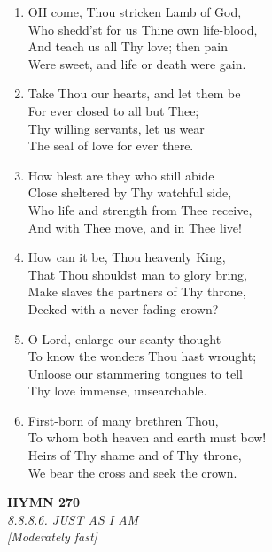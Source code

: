 \begin{enumerate}
    \item OH come, Thou stricken Lamb of God, \\
        Who shedd'st for us Thine own life-blood, \\
        And teach us all Thy love; then pain \\
        Were sweet, and life or death were gain.

    \item Take Thou our hearts, and let them be \\
        For ever closed to all but Thee; \\
        Thy willing servants, let us wear \\
        The seal of love for ever there.

    \item How blest are they who still abide \\
        Close sheltered by Thy watchful side, \\
        Who life and strength from Thee receive, \\
        And with Thee move, and in Thee live!

    \item How can it be, Thou heavenly King, \\
        That Thou shouldst man to glory bring, \\
        Make slaves the partners of Thy throne, \\
        Decked with a never-fading crown?

    \item O Lord, enlarge our scanty thought \\
        To know the wonders Thou hast wrought; \\
        Unloose our stammering tongues to tell \\
        Thy love immense, unsearchable.

    \item First-born of many brethren Thou, \\
        To whom both heaven and earth must bow! \\
        Heirs of Thy shame and of Thy throne, \\
        We bear the cross and seek the crown.

\end{enumerate}

\newpage
\begin{center}
    {\Large \textbf{HYMN 270}}
    \\
    \textit{8.8.8.6. JUST AS I AM}
    \\
    \textit{\small [Moderately fast]}
\end{center}
\vspace{1em}

